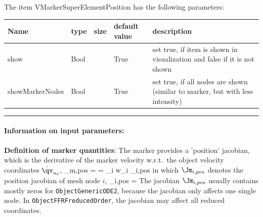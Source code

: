 \noindent The item VMarkerSuperElementPosition has the following parameters:
\begin{center}
  \footnotesize
  \begin{longtable}{| p{4.5cm} | p{2.5cm} | p{0.5cm} | p{2.5cm} | p{6cm} |}
    \hline
    \bf Name & \bf type & \bf size & \bf default value & \bf description \\ \hline
    show &     Bool &      &     True &     set true, if item is shown in visualization and false if it is not shown\\ \hline
    showMarkerNodes &     Bool &      &     True &     set true, if all nodes are shown (similar to marker, but with less intensity)\\ \hline
\end{longtable}
\end{center}
\par\noindent\rule{\textwidth}{0.4pt}
\label{description_MarkerSuperElementPosition}
\paragraph{Information on input parameters:} 
\finishTable
 \noindent
    {\bf Definition of marker quantities}:
    \finishTable
    \vspace{6pt}
    The marker provides a 'position' jacobian, which is the derivative of the marker velocity w.r.t.\ the 
    object velocity coordinates $\dot \qv_{n_b}$,
    \be
      \Jm_{m,pos} = 
      = \sum_i w_i \cdot \Jm_{i,pos}
    \ee
    in which $\Jm_{i,pos}$ denotes the position jacobian of mesh node $i$,
    \be
      \Jm_{i,pos} = 
    \ee
    The jacobian $\Jm_{i,pos}$ usually contains mostly zeros for \texttt{ObjectGenericODE2}, because the jacobian only affects one single node.
    In \texttt{ObjectFFRFreducedOrder}, the jacobian may affect all reduced coordinates.

